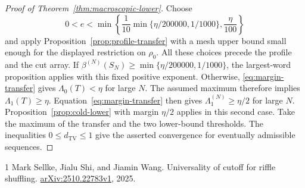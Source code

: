 \documentclass[11pt]{article}
\numberwithin{equation}{section}
\theoremstyle{definition}
\theoremstyle{remark}
\newcommand{\TV}{\mathrm{TV}}
\newcommand{\dTV}{d_{\TV}}
\newcommand{\1}{\mathbf 1}
\begin{document}
\begin{proof}[Proof of Theorem~\ref{thm:macroscopic-lower}]
Choose
\[
 0<e<\min\left\{\frac1{10}\min\{\eta/200000,1/1000\},
                          \frac{\eta}{100}\right\}
\]
and apply Proposition~\ref{prop:profile-transfer} with a mesh upper bound
small enough for the displayed restriction on $\rho_0$. All these choices
precede the profile and the cut array. If
$\beta^{(N)}(S_N)\ge\min\{\eta/200000,1/1000\}$, the largest-word
proposition applies with this fixed positive exponent. Otherwise,
\eqref{eq:margin-transfer} gives $\Lambda_0(T)<\eta$ for
large $N$. The assumed maximum therefore implies $\Lambda_1(T)\ge\eta$.
Equation~\eqref{eq:margin-transfer} then gives
$\Lambda_1^{(N)}\ge\eta/2$ for large $N$. Proposition~\ref{prop:cold-lower}
with margin $\eta/2$ applies in this second case. Take the maximum of the
transfer and the two lower-bound thresholds. The inequalities
$0\le\dTV\le1$ give the asserted convergence for eventually admissible
sequences.
\end{proof}







\begin{thebibliography}{1}
Mark Sellke, Jialu Shi, and Jiamin Wang.
\newblock Universality of cutoff for riffle shuffling.
\newblock \href{https://arxiv.org/abs/2510.22783v1}{arXiv:2510.22783v1}, 2025.
\end{thebibliography}
\end{document}
